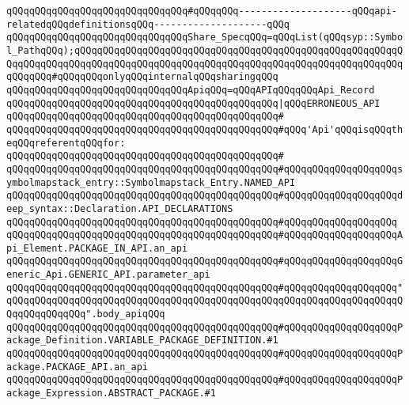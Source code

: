 \verb|qQQqqQQqqQQqqQQqqQQqqQQqqQQqqQQq#qQQqqQQq--------------------qQQqapi-relatedqQQqdefinitionsqQQq--------------------qQQq|\newline
\newline
\verb|qQQqqQQqqQQqqQQqqQQqqQQqqQQqqQQqShare_SpecqQQq=qQQqList(qQQqsyp::Symbol_PathqQQq);qQQqqQQqqQQqqQQqqQQqqQQqqQQqqQQqqQQqqQQqqQQqqQQqqQQqqQQqqQQqqQQqqQQqqQQqqQQqqQQqqQQqqQQqqQQqqQQqqQQqqQQqqQQqqQQqqQQqqQQqqQQqqQQqqQQqqQQq#qQQqqQQqonlyqQQqinternalqQQqsharingqQQq|\newline
\newline
\verb|qQQqqQQqqQQqqQQqqQQqqQQqqQQqqQQqApiqQQq=qQQqAPIqQQqqQQqApi_Record|\newline
\verb|qQQqqQQqqQQqqQQqqQQqqQQqqQQqqQQqqQQqqQQqqQQqqQQq|\verb#|qQQqERRONEOUS_API#\newline
\verb|qQQqqQQqqQQqqQQqqQQqqQQqqQQqqQQqqQQqqQQqqQQqqQQq#|\newline
\verb|qQQqqQQqqQQqqQQqqQQqqQQqqQQqqQQqqQQqqQQqqQQqqQQq#qQQq'Api'qQQqisqQQqtheqQQqreferentqQQqfor:|\newline
\verb|qQQqqQQqqQQqqQQqqQQqqQQqqQQqqQQqqQQqqQQqqQQqqQQq#|\newline
\verb|qQQqqQQqqQQqqQQqqQQqqQQqqQQqqQQqqQQqqQQqqQQqqQQq#qQQqqQQqqQQqqQQqqQQqsymbolmapstack_entry::Symbolmapstack_Entry.NAMED_API|\newline
\verb|qQQqqQQqqQQqqQQqqQQqqQQqqQQqqQQqqQQqqQQqqQQqqQQq#qQQqqQQqqQQqqQQqqQQqdeep_syntax::Declaration.API_DECLARATIONS|\newline
\verb|qQQqqQQqqQQqqQQqqQQqqQQqqQQqqQQqqQQqqQQqqQQqqQQq#qQQqqQQqqQQqqQQqqQQq|\newline
\verb|qQQqqQQqqQQqqQQqqQQqqQQqqQQqqQQqqQQqqQQqqQQqqQQq#qQQqqQQqqQQqqQQqqQQqApi_Element.PACKAGE_IN_API.an_api|\newline
\verb|qQQqqQQqqQQqqQQqqQQqqQQqqQQqqQQqqQQqqQQqqQQqqQQq#qQQqqQQqqQQqqQQqqQQqGeneric_Api.GENERIC_API.parameter_api|\newline
\verb|qQQqqQQqqQQqqQQqqQQqqQQqqQQqqQQqqQQqqQQqqQQqqQQq#qQQqqQQqqQQqqQQqqQQq"qQQqqQQqqQQqqQQqqQQqqQQqqQQqqQQqqQQqqQQqqQQqqQQqqQQqqQQqqQQqqQQqqQQqqQQqqQQqqQQqqQQq".body_apiqQQq|\newline
\verb|qQQqqQQqqQQqqQQqqQQqqQQqqQQqqQQqqQQqqQQqqQQqqQQq#qQQqqQQqqQQqqQQqqQQqPackage_Definition.VARIABLE_PACKAGE_DEFINITION.#1|\newline
\verb|qQQqqQQqqQQqqQQqqQQqqQQqqQQqqQQqqQQqqQQqqQQqqQQq#qQQqqQQqqQQqqQQqqQQqPackage.PACKAGE_API.an_api|\newline
\verb|qQQqqQQqqQQqqQQqqQQqqQQqqQQqqQQqqQQqqQQqqQQqqQQq#qQQqqQQqqQQqqQQqqQQqPackage_Expression.ABSTRACT_PACKAGE.#1|\newline
